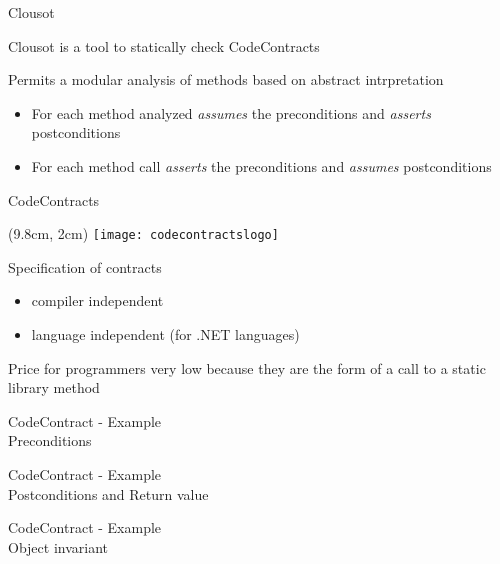 \begin{frame}{Clousot}

Clousot is a tool to statically check CodeContracts

\vspace*{1cm}

Permits a modular analysis of methods based on abstract intrpretation
\begin{itemize}
  \item For each method analyzed \emph{assumes} the preconditions and
  \emph{asserts} postconditions

  \item For each method call \emph{asserts} the preconditions and
  \emph{assumes} postconditions
\end{itemize}

\end{frame}



\begin{frame}{CodeContracts}

\begin{textblock*}{1cm}(9.8cm, 2cm)
    \texttt{[image: codecontractslogo]}
\end{textblock*}

Specification of contracts
\begin{itemize}
  \item compiler independent
  \item language independent (for .NET languages)
\end{itemize}

\vspace*{1cm}

Price for programmers very low because they are the form of a call to a static
library method

\end{frame}


\begin{frame}[fragile]{CodeContract - Example\\Preconditions}
\vspace*{-0.4cm}

\end{frame}



\begin{frame}[fragile]{CodeContract - Example\\Postconditions and Return value}
\vspace*{-0.3cm}

\end{frame}



\begin{frame}[fragile]{CodeContract - Example\\Object invariant}
\vspace*{-0.5cm}

\end{frame}